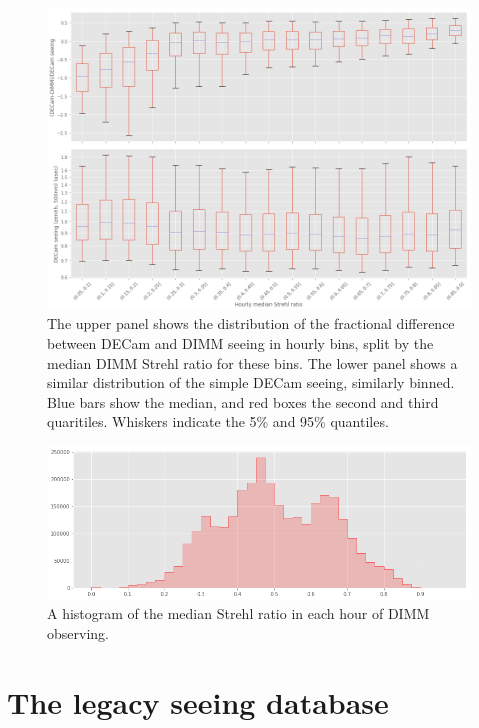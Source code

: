\documentclass[\docopts]{\docclass}
\begin{document}
\begin{figure}
  \includegraphics[width=\columnwidth]{strehl_boxplots.png}
  \caption{
    The upper panel shows the distribution of the fractional
    difference between DECam and DIMM seeing in hourly bins, split by
    the median DIMM Strehl ratio for these bins. The lower panel shows
    a similar distribution of the simple DECam seeing, similarly
    binned. Blue bars show the median, and red boxes the second and
    third quaritiles. Whiskers indicate the 5\% and 95\% quantiles.
    }
  \label{fig:strehl-boxplots}
\end{figure}

\begin{figure}
  \includegraphics[width=\columnwidth]{strehl_hist.png}
  \caption{
    A histogram of the median Strehl ratio in each hour of DIMM observing.
  }
  \label{fig:strehl-hist}
\end{figure}

\section{The legacy seeing database}
\end{document}
